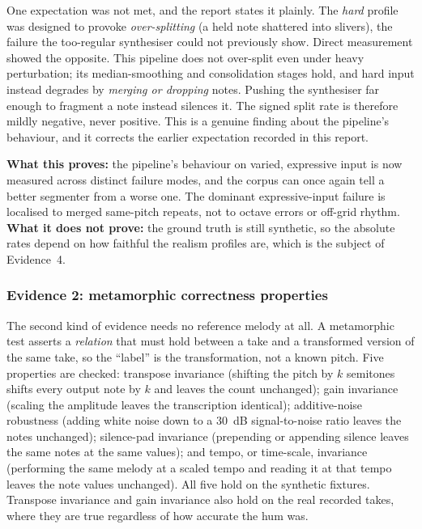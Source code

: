 \documentclass[12pt,a4paper]{article}
\begin{document}
One expectation was not met, and the report states it plainly. The \emph{hard}
profile was designed to provoke \emph{over-splitting} (a held note shattered into
slivers), the failure the too-regular synthesiser could not previously show.
Direct measurement showed the opposite. This pipeline does not over-split even
under heavy perturbation; its median-smoothing and consolidation stages hold, and
hard input instead degrades by \emph{merging or dropping} notes. Pushing the
synthesiser far enough to fragment a note instead silences it. The signed split
rate is therefore mildly negative, never positive. This is a genuine finding
about the pipeline's behaviour, and it corrects the earlier expectation recorded
in this report.

\textbf{What this proves:} the pipeline's behaviour on varied, expressive input is
now measured across distinct failure modes, and the corpus can once again tell a
better segmenter from a worse one. The dominant expressive-input failure is
localised to merged same-pitch repeats, not to octave errors or off-grid rhythm.
\textbf{What it does not prove:} the ground truth is still synthetic, so the
absolute rates depend on how faithful the realism profiles are, which is the
subject of Evidence~4.

\subsubsection{Evidence 2: metamorphic correctness properties}
\label{sec:meta}

The second kind of evidence needs no reference melody at all. A metamorphic test
asserts a \emph{relation} that must hold between a take and a transformed version
of the same take, so the ``label'' is the transformation, not a known pitch. Five
properties are checked: transpose invariance (shifting the pitch by $k$ semitones
shifts every output note by $k$ and leaves the count unchanged); gain invariance
(scaling the amplitude leaves the transcription identical); additive-noise
robustness (adding white noise down to a $30$~dB signal-to-noise ratio leaves the
notes unchanged); silence-pad invariance (prepending or appending silence leaves
the same notes at the same values); and tempo, or time-scale, invariance
(performing the same melody at a scaled tempo and reading it at that tempo leaves
the note values unchanged). All five hold on the synthetic fixtures. Transpose
invariance and gain invariance also hold on the real recorded takes, where they
are true regardless of how accurate the hum was.
\end{document}
